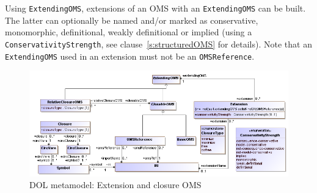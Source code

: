 \documentclass[10pt, a4paper]{isov2}
\newcommand*{\syntax}[1]{\texttt{#1}}
\begin{document}
Using \syntax{ExtendingOMS}, extensions of an OMS with an \syntax{ExtendingOMS}
can be built. The latter can optionally be named and/or marked as conservative, monomorphic, definitional, weakly definitional or implied (using a \syntax{ConservativityStrength}, see clause~\ref{s:structuredOMS} for details).
Note that an \syntax{ExtendingOMS} used in an extension must
not be an \syntax{OMSReference}.

\medskip
\begin{figure}
  \centering
    \includegraphics[scale=0.47]{mof/extension&closure.png}
  \caption{DOL metamodel: Extension and closure OMS}
  \label{fig:extension&closure}
\end{figure}
\end{document}
